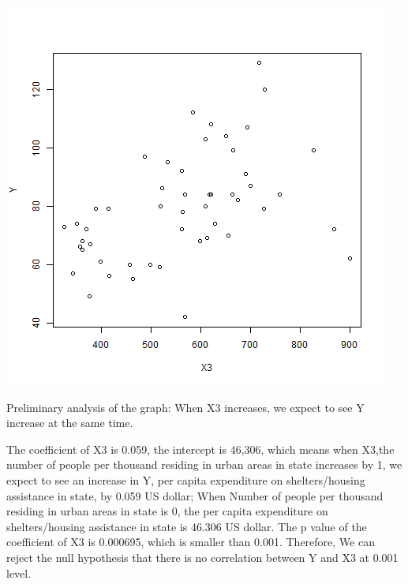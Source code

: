 \documentclass[12pt,letterpaper]{article}
\begin{document}
\begin{itemize}
\includegraphics[scale=.80]{Y ~ X3.png}

Preliminary analysis of the graph: When X3 increases, we expect to see Y increase at the same time.

The coefficient of X3 is 0.059, the intercept is 46,306, which means when X3,the number of people per thousand residing in urban areas in state  increases by 1, we expect to see an increase in Y, per capita expenditure on shelters/housing assistance in state, by 0.059 US dollar; When Number of people per thousand residing in urban areas in state is 0, the per capita expenditure on shelters/housing assistance in state is 46.306 US dollar.
The p value of the coefficient of X3 is 0.000695, which is smaller than 0.001. Therefore, We can reject the null hypothesis that there is no correlation between Y and X3 at 0.001 level.


 


\end{itemize}
\end{document}
